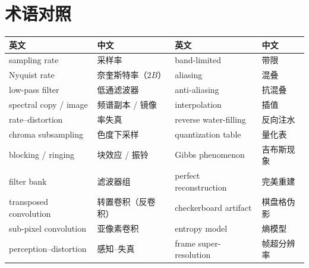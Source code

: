 \section{术语对照}

\begin{table}[htbp]
\centering
\begin{tabular}{llll}
\toprule
英文 & 中文 & 英文 & 中文 \\
\midrule
sampling rate & 采样率 & band-limited & 带限 \\
Nyquist rate & 奈奎斯特率（$2B$） & aliasing & 混叠 \\
low-pass filter & 低通滤波器 & anti-aliasing & 抗混叠 \\
spectral copy / image & 频谱副本 / 镜像 & interpolation & 插值 \\
rate--distortion & 率失真 & reverse water-filling & 反向注水 \\
chroma subsampling & 色度下采样 & quantization table & 量化表 \\
blocking / ringing & 块效应 / 振铃 & Gibbs phenomenon & 吉布斯现象 \\
filter bank & 滤波器组 & perfect reconstruction & 完美重建 \\
transposed convolution & 转置卷积（反卷积） & checkerboard artifact & 棋盘格伪影 \\
sub-pixel convolution & 亚像素卷积 & entropy model & 熵模型 \\
perception--distortion & 感知--失真 & frame super-resolution & 帧超分辨率 \\
\bottomrule
\end{tabular}
\end{table}

